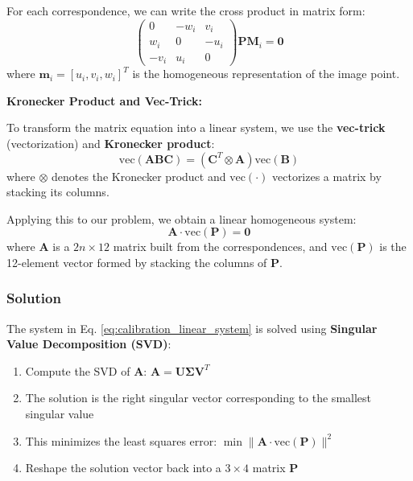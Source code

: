 \documentclass[11pt,a4paper]{article}
\theoremstyle{definition}
\theoremstyle{plain}
\theoremstyle{remark}
\begin{document}
For each correspondence, we can write the cross product in matrix form:
\begin{equation} \nonumber
    \begin{pmatrix}
    0 & -w_i & v_i \\
    w_i & 0 & -u_i \\
    -v_i & u_i & 0
    \end{pmatrix} \mathbf{P} \mathbf{M}_i = \mathbf{0}
\end{equation}
where $\mathbf{m}_i = [u_i, v_i, w_i]^T$ is the homogeneous representation of the image point.

\textbf{Kronecker Product and Vec-Trick:}

To transform the matrix equation into a linear system, we use the \textbf{vec-trick} (vectorization) and \textbf{Kronecker product}:
\begin{equation} \label{eq:vec_trick}
    \text{vec}(\mathbf{A} \mathbf{B} \mathbf{C}) = (\mathbf{C}^T \otimes \mathbf{A}) \text{vec}(\mathbf{B})
\end{equation}
where $\otimes$ denotes the Kronecker product and $\text{vec}(\cdot)$ vectorizes a matrix by stacking its columns.

Applying this to our problem, we obtain a linear homogeneous system:
\begin{equation} \label{eq:calibration_linear_system}
    \mathbf{A} \cdot \text{vec}(\mathbf{P}) = \mathbf{0}
\end{equation}
where $\mathbf{A}$ is a $2n \times 12$ matrix built from the correspondences, and $\text{vec}(\mathbf{P})$ is the 12-element vector formed by stacking the columns of $\mathbf{P}$.

\subsubsection{Solution}

The system in Eq. \eqref{eq:calibration_linear_system} is solved using \textbf{Singular Value Decomposition (SVD)}:

\begin{enumerate}
    \item Compute the SVD of $\mathbf{A}$: $\mathbf{A} = \mathbf{U} \boldsymbol{\Sigma} \mathbf{V}^T$
    \item The solution is the right singular vector corresponding to the smallest singular value
    \item This minimizes the least squares error: $\min \|\mathbf{A} \cdot \text{vec}(\mathbf{P})\|^2$
    \item Reshape the solution vector back into a $3 \times 4$ matrix $\mathbf{P}$
\end{enumerate}
\end{document}
